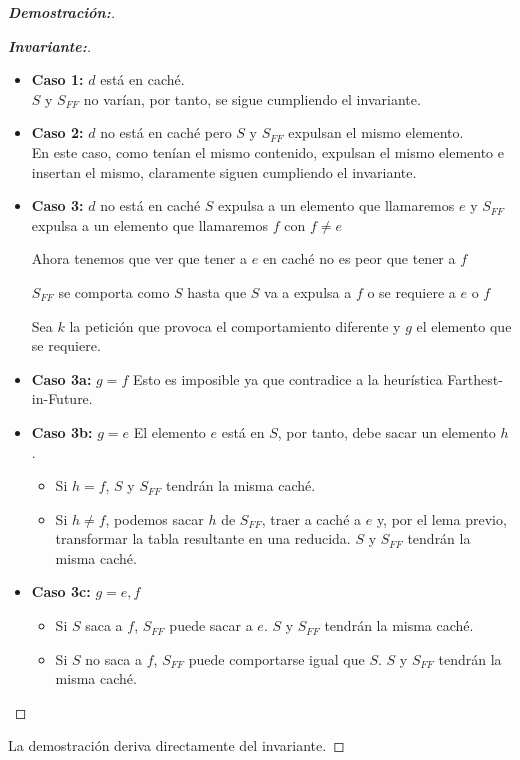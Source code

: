 \documentclass[a4paper, 11pt]{article} %
\begin{document}
\begin{proof}[\textbf{Demostración:}]
\begin{proof}[\textbf{Invariante:}]
\begin{itemize}
	  	\item \textbf{Caso 1: } $d$ está en caché.\\
	  	$S$ y $S_{FF}$ no varían, por tanto, se sigue cumpliendo el invariante.
	  	
	  	\item \textbf{Caso 2: } $d$ no está en caché pero $S$ y $S_{FF}$ expulsan el mismo elemento. \\
	  	En este caso, como tenían el mismo contenido, expulsan el mismo elemento e insertan el mismo, claramente siguen cumpliendo el invariante.
	  	
	  	\item \textbf{Caso 3: } $d$ no está en caché $S$ expulsa a un elemento que llamaremos $e$ y $S_{FF}$ expulsa a un elemento que llamaremos $f$ con $f \neq e$
	  	
	  	Ahora tenemos que ver que tener a $e$ en caché no es peor que tener a $f$
	  	
	  	$S_{FF}$ se comporta como $S$ hasta que $S$ va a expulsa a $f$ o se requiere a $e$ o $f$
	  	
	  	Sea $k$ la petición que provoca el comportamiento diferente y $g$ el elemento que se requiere.
	  	
	  	\item \textbf{Caso 3a: } $g = f$
	  	Esto es imposible ya que contradice a la heurística Farthest-in-Future.
	  	
	  	\item \textbf{Caso 3b: } $g = e$
	  	El elemento $e$ está en $S$, por tanto, debe sacar un elemento $h$.
	  	
	  	\begin{itemize}
	  	  \item Si $h = f$, $S$ y $S_{FF}$ tendrán la misma caché.
	  	  
	  	  \item Si $h \neq f$, podemos sacar $h$ de $S_{FF}$, traer a caché a $e$ y, por el lema previo, transformar la tabla resultante en una reducida. $S$ y $S_{FF}$ tendrán la misma caché.
	  	\end{itemize}
	  	\item \textbf{Caso 3c: } $g = e, f$
	  	\begin{itemize}
	 	  \item Si $S$ saca a $f$, $S_{FF}$ puede sacar a $e$. $S$ y $S_{FF}$ tendrán la misma caché.
	 	  
	 	  \item Si $S$ no saca a $f$, $S_{FF}$ puede comportarse igual que $S$. $S$ y $S_{FF}$ tendrán la misma caché.
 		\end{itemize}
	  	
	  \end{itemize}
	  
	\end{proof}
	
	La demostración deriva directamente del invariante.
  \end{proof}
  
\end{document}
